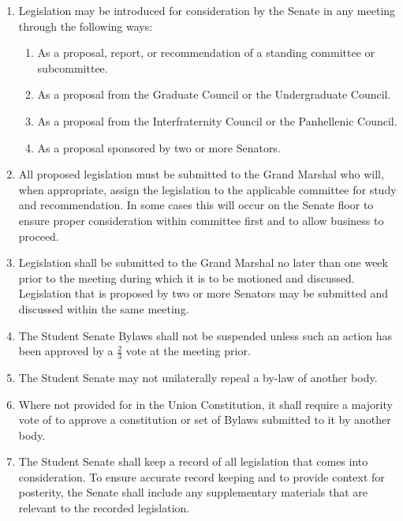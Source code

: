 
\begin{enumerate}

\item Legislation may be introduced for consideration by the Senate in any meeting through the following ways:
\begin{enumerate}
\item As a proposal, report, or recommendation of a standing committee or subcommittee.
\item As a proposal from the Graduate Council or the Undergraduate Council.
\item As a proposal from the Interfraternity Council or the Panhellenic Council.
\item As a proposal sponsored by two or more Senators.
\end{enumerate}

\item All proposed legislation must be submitted to the Grand Marshal who will, when appropriate, assign the legislation to the
applicable committee for study and recommendation. In some cases this will occur on the Senate floor to ensure proper
consideration within committee first and to allow business to proceed.

\item Legislation shall be submitted to the Grand Marshal no later than one week prior to the meeting during which it is to be
motioned and discussed. Legislation that is proposed by two or more Senators may be submitted and discussed within the same
meeting.

\item The Student Senate Bylaws shall not be suspended unless such an action has been approved by a $\frac{2}{3}$ vote at the meeting prior.

\item The Student Senate may not unilaterally repeal a by-law of another body.

\item Where not provided for in the Union Constitution, it shall require a majority vote of to approve a constitution or set of Bylaws
submitted to it by another body.

\item The Student Senate shall keep a record of all legislation that comes into consideration. To ensure accurate record keeping and to
provide context for posterity, the Senate shall include any supplementary materials that are relevant to the recorded legislation. 

\end{enumerate}